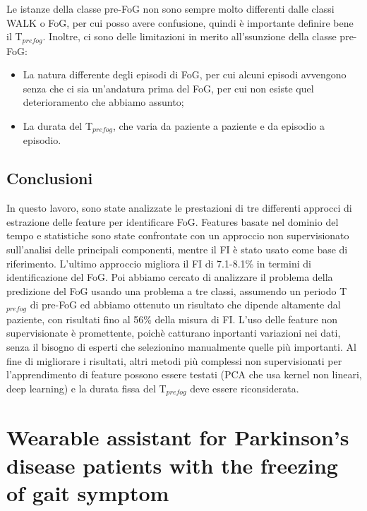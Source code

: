 \documentclass[a4paper,11pt]{article} %
\begin{document}
Le istanze della classe pre-FoG non sono sempre molto differenti dalle classi WALK o FoG, per cui posso avere confusione, quindi è importante definire bene il T$_{prefog}$. Inoltre, ci sono delle limitazioni in merito all'ssunzione della classe pre-FoG:
\begin{itemize}
\item La natura differente degli episodi di FoG, per cui alcuni episodi avvengono senza che ci sia un'andatura prima del FoG, per cui non esiste quel deterioramento che abbiamo assunto;
\item La durata del T$_{prefog}$, che varia da paziente a paziente e da episodio a episodio.
\end{itemize}
\subsection{Conclusioni}
In questo lavoro, sono state analizzate le prestazioni di tre differenti approcci di estrazione delle feature per identificare FoG. Features basate nel dominio del tempo e statistiche sono state confrontate con un approccio non supervisionato sull'analisi delle principali componenti, mentre il FI è stato usato come base di riferimento. L'ultimo approccio migliora il FI di 7.1-8.1\% in termini di identificazione del FoG. Poi abbiamo cercato di analizzare il problema della predizione del FoG usando una problema a tre classi, assumendo un periodo T$_{prefog}$ di pre-FoG ed abbiamo ottenuto un risultato che dipende altamente dal paziente, con risultati fino al 56\% della misura di FI.\linebreak
L'uso delle feature non supervisionate è promettente, poichè catturano inportanti variazioni nei dati, senza il bisogno di esperti che selezionino manualmente quelle più importanti. Al fine di migliorare i risultati, altri metodi più complessi non supervisionati per l'apprendimento di feature possono essere testati (PCA che usa kernel non lineari, deep learning) e la durata fissa del T$_{prefog}$ deve essere riconsiderata. 

\section{Wearable assistant for Parkinson's disease patients with the freezing of gait symptom\cite{due}}
\end{document}
